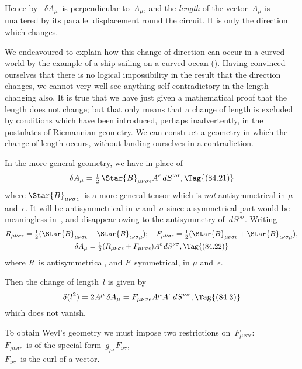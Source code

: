 \documentclass[12pt]{book}
\begin{document}
Hence by~ $\delta A_{\mu}$~is perpendicular to~$A_{\mu}$, and the \emph{length} of the vector~$A_{\mu}$
is unaltered by its parallel displacement round the circuit. It is only the
direction which changes.

We endeavoured to explain how this change of direction can occur in a
curved world by the example of a ship sailing on a curved ocean (). Having
convinced ourselves that there is no logical impossibility in the result that the
direction changes, we cannot very well see anything self-contradictory in the
length changing also. It is true that we have just given a mathematical proof
that the length does not change; but that only means that a change of length
is excluded by conditions which have been introduced, perhaps inadvertently,
in the postulates of Riemannian geometry. We can construct a geometry in
which the change of length occurs, without landing ourselves in a contradiction.

In the more general geometry, we have in place of~
\[
\delta A_{\mu} = \tfrac{1}{2}\, \Star{B}_{\mu\nu\sigma\epsilon} A^{\epsilon}\, dS^{\nu\sigma},
\Tag{(84.21)}
\]
where $\Star{B}_{\mu\nu\sigma\epsilon}$~is a more general tensor which is \emph{not} antisymmetrical in $\mu$ and~$\epsilon$.
It will be antisymmetrical in $\nu$ and~$\sigma$ since a symmetrical part would be
meaningless in~, and disappear owing to the antisymmetry of~$dS^{\nu\sigma}$.
Writing
\begin{gather*}
  R_{\mu\nu\sigma\epsilon} = \tfrac{1}{2}(\Star{B}_{\mu\nu\sigma\epsilon} - \Star{B}_{\epsilon\nu\sigma\mu});\quad
  F_{\mu\nu\sigma\epsilon} = \tfrac{1}{2}(\Star{B}_{\mu\nu\sigma\epsilon} + \Star{B}_{\epsilon\nu\sigma\mu}), \\
  \delta A_{\mu} = \tfrac{1}{2}(R_{\mu\nu\sigma\epsilon} + F_{\mu\nu\sigma\epsilon}) A^{\epsilon}\, dS^{\nu\sigma},
  \Tag{(84.22)}
\end{gather*}
where $R$~is antisymmetrical, and $F$~symmetrical, in $\mu$ and~$\epsilon$.

Then the change of length~$l$ is given by
\[
\delta(l^{2}) = 2A^{\mu}\, \delta A_{\mu}
= F_{\mu\nu\sigma\epsilon} A^{\mu} A^{\epsilon}\, dS^{\nu\sigma},
\Tag{(84.3)}
\]
which does not vanish.

To obtain Weyl's geometry we must impose two restrictions on~$F_{\mu\nu\sigma\epsilon}$: \\
\Indent{} $F_{\mu\nu\sigma\epsilon}$~is of the special form~$g_{\mu\epsilon}F_{\nu\sigma}$, \\
\Indent{} $F_{\nu\sigma}$~is the curl of a vector.
\end{document}

